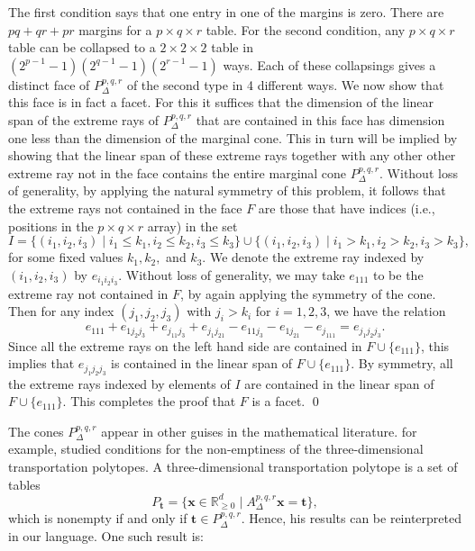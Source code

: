 \documentclass{elsart}
\begin{document}
\begin{pf}
The first condition says that one entry in one of the margins is zero.  There
are $pq + qr + pr$ margins for a $p\times q \times r$ table.
For the second condition, any $p\times q \times r$ table can be
collapsed to a $2 \times 2 \times 2$ table in
$(2^{p-1}-1)(2^{q-1}-1)(2^{r-1} -1)$ ways.  Each of these collapsings
gives a distinct face of $P_\Delta^{p,q,r}$ of the second type in 4
different ways.   We now show that this face is in fact a facet.
For this it suffices that the dimension of the linear span of the
extreme rays of  $P^{p,q,r}_\Delta$ that are contained in this face
has dimension 
one less than the dimension of the marginal cone.  This in turn will be
implied by showing that the linear span of these extreme rays
together with any other other extreme ray not in the face contains the
entire marginal cone  $P^{p,q,r}_\Delta$.  
Without loss of generality, by applying the natural symmetry of
this problem, it follows that the extreme rays not contained in
the face $F$ are those that have indices (i.e., positions in the $p
\times q \times r $ array) in the set
\[
I =  \{ (i_1, i_2, i_3) \mid i_1 \leq k_1, i_2 \leq k_2, i_3 \leq k_3 \}
\cup \{(i_1, i_2, i_3) \mid i_1 > k_1, i_2 > k_2, i_3 > k_3 \},
\]
for some fixed values $k_1, k_2,$ and $k_3$.
We denote the extreme ray indexed by $(i_1, i_2, i_3)$ by
$e_{i_1i_2i_3}$.  Without loss of generality, we may take $e_{111}$ to
be the extreme ray not contained in $F$, by again applying the
symmetry of the cone.  Then for any index $(j_1, j_2, j_3)$ with
$j_i > k_i$ for $i=1,2,3$,
we have the relation
\[
e_{111} + e_{1j_2j_3} + e_{j_11j_3} + e_{j_1j_21} - e_{11j_3} -
e_{1j_21}-e_{j_111} = e_{j_1j_2j_3}.
\]
Since all the extreme rays on the left hand side are
contained in $F \cup \{e_{111}\}$, this implies that $e_{j_1j_2j_3}$
is contained in the linear span of $F \cup \{e_{111}\}$.  By symmetry,
all the extreme rays indexed by elements of $I$ are contained in the
linear span of $F \cup \{e_{111}\}$.  This completes the proof that
$F$ is a facet.
\qed
\end{pf}

The cones $P_\Delta^{p,q,r}$  appear in other guises in the mathematical literature. 
for example,  \citet{vlach} studied conditions
for the non-emptiness of the three-dimensional transportation
polytopes.  A three-dimensional transportation polytope is a set of
tables
$$ P_\mathbf{t} = \{\mathbf{x} \in \mathbb{R}^d_{\geq 0} \mid
A^{p,q,r}_\Delta \mathbf{x} = \mathbf{t} \},$$
which is nonempty if and only if $\mathbf{t} \in P^{p,q,r}_\Delta$.
Hence, his results can be reinterpreted in our language.  One such
result is:
\end{document}
